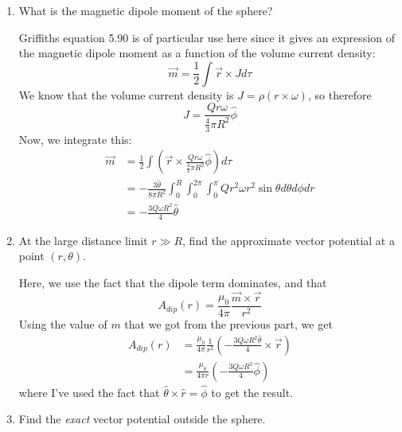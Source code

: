 \documentclass[10pt]{article}
\begin{document}
	\begin{enumerate}[label=\alph*)]
		\item What is the magnetic dipole moment of the sphere?

			\begin{solution}
				Griffiths equation 5.90 is of particular use here since it gives an expression of the magnetic
				dipole moment as a function of the volume current density: 
				\[
				\vec m = \frac{1}{2}\int \vec r \times J d\tau
				\] 
				We know that the volume current density is $J = \rho (r \times \omega)$, so therefore
				\[
				J = \frac{Qr \omega}{\frac{4}{3}\pi R^2}\hat{\phi}
				\] 
				Now, we integrate this:
				\begin{align*}
					\vec m &= \frac{1}{2}\int (\vec r \times \frac{Qr \omega}{\frac{4}{3}\pi R^2}\hat{ \phi}) 
					d\tau\\
						   &= -\frac{3 \hat{ \theta}}{8\pi R^2} \int_0^R \int_0^{2\pi} \int_0^\pi Q r^2 \omega
						   r^2 \sin \theta d\theta d\phi dr\\
						   &= -\frac{3Q \omega R^2}{4}\hat{\theta} 
				\end{align*}
			\end{solution}

		\item At the large distance limit $r \gg R$, find the approximate vector potential at a point 
			$(r, \theta)$.

			\begin{solution}
				Here, we use the fact that the dipole term dominates, and that 
				\[
					A_{dip}(r) = \frac{\mu_0}{4\pi}\frac{\vec m \times \vec r}{r^2}
				\] 
				Using the value of $m$ that we got from the previous part, we get
				\begin{align*}
					A_{dip}(r) &= \frac{\mu_0}{4\pi}\frac{1}{r^2}\left( -\frac{3Q \omega R^2 \hat{ \theta}}{4}
					\times \vec r\right) \\
					&= \frac{\mu_0}{4\pi r} \left( -\frac{3Q\omega R^2}{4}\hat{ \phi} \right)
				\end{align*} 
				where I've used the fact that $\hat{\theta} \times \hat{r} = \hat{\phi}$ to get the result. 
			\end{solution}

		\item Find the \textit{exact} vector potential outside the sphere.


\end{enumerate}
\end{document}
